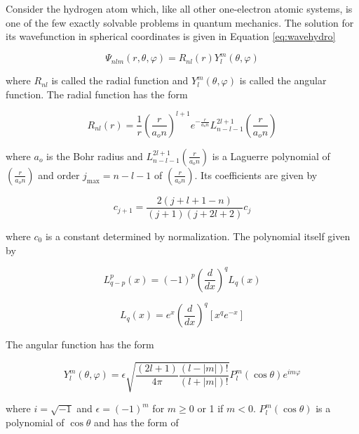 Consider the hydrogen atom which, like all other one-electron atomic systems, is one of the few exactly solvable problems in quantum mechanics. The solution for its wavefunction in spherical coordinates is given in Equation \ref{eq:wavehydro}\cite{Griffiths2}

\begin{equation}
\label{eq:wavehydro}
\Psi_{nlm}(r, \theta, \varphi) = R_{nl}(r)Y^{m}_{l}(\theta,\varphi)
\end{equation} 

where $R_{nl}$ is called the radial function and $Y^{m}_{l}(\theta,\varphi)$ is called the angular function. The radial function has the form 

\begin{equation}
\label{eq:wavehydro_R}
R_{nl}(r) = \frac{1}{r}\left(\frac{r}{a_{o}n}\right)^{l+1}e^{-\frac{r}{a_{o}n}}L^{2l+1}_{n-l-1}\left(\frac{r}{a_{o}n}\right)
\end{equation} 

where $a_{o}$ is the Bohr radius and $L^{2l+1}_{n-l-1}\left(\frac{r}{a_{o}n}\right)$ is a Laguerre polynomial of $\left(\frac{r}{a_{o}n}\right)$ and order $j_{\text{max}}=n-l-1$ of $\left(\frac{r}{a_{o}n}\right)$. Its coefficients are given by

\begin{equation}
\label{eq:wavehydro_R_coef}
c_{j+1} = \frac{2(j+l+1-n)}{(j+1)(j+2l+2)}c_{j}
\end{equation} 

where $c_{0}$ is a constant determined by normalization. The polynomial itself given by

\begin{equation}
\label{eq:wavehydro_L1}
L^{p}_{q-p}(x) = (-1)^{p}\left(\frac{d}{dx}\right)^{q}L_{q}(x)
\end{equation}

\begin{equation}
\label{eq:wavehydro_L2}
L_{q}(x) = e^{x}\left(\frac{d}{dx}\right)^{q}\left[x^{q}e^{-x}\right]
\end{equation}

The angular function has the form 

\begin{equation}
\label{eq:wavehydro_Y1}
Y^{m}_{l}(\theta,\varphi) = \epsilon\sqrt{\frac{(2l + 1)}{4\pi}\frac{(l-|m|)!}{(l+|m|)!}}P^{m}_{l}(\cos\theta)e^{im\varphi}
\end{equation}

where $i=\sqrt{-1}$ and $\epsilon = (-1)^{m}$ for $m \geq 0$ or 1 if  $m < 0$. $P^{m}_{l}(\cos\theta)$ is a polynomial of $\cos\theta$ and has the form of

